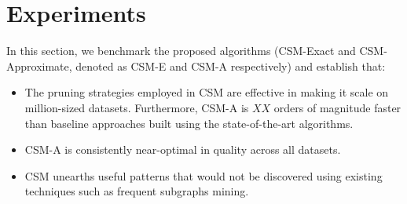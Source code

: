 \chapter{Experiments}
\label{sec:experiments}

In this section, we benchmark the proposed algorithms (CSM-Exact and CSM-Approximate, denoted as CSM-E and CSM-A respectively) and establish that:
\begin{itemize}
\item The pruning strategies employed in CSM are effective in making it scale on million-sized datasets. Furthermore, CSM-A is $XX$ orders of magnitude faster than baseline approaches built using the state-of-the-art algorithms.
\item CSM-A is consistently near-optimal in quality across all datasets.
\item CSM unearths useful patterns that would not be discovered using existing techniques such as frequent subgraphs mining.
\end{itemize}




